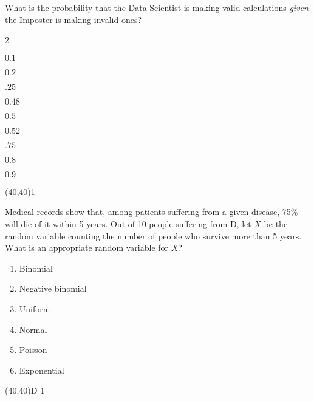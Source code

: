 \documentclass[addpoints]{exam}
\def\solutions{0}
\begin{document}
{\begin{questions}
\question[3] What is the probability that the Data Scientist is making valid calculations \textit{given} the Imposter is making invalid ones?
\vspace{2mm}

\begin{minipage}[b]{.85\textwidth}
	\begin{enumerate}[label=\Alph*.]
	\end{enumerate}
\end{minipage}
\begin{minipage}[b]{.1\textwidth}
	\vspace{\fill}\framebox(40,40){\if\solutions1 \fi}
\end{minipage}

\clearpage
\question[3] Medical records show that, among patients suffering from a given disease, 75\% will die of it within 5 years.  Out of 10 people suffering from D, let $X$ be the random variable counting the number of people who survive more than 5 years.  What is an appropriate random variable for $X$?
\vspace{2mm}

\begin{minipage}[b]{.85\textwidth}
	\begin{enumerate}[label=\Alph*.]
		\item Binomial
		\item Negative binomial
		\item Uniform
		\item Normal
		\item Poisson
		\item Exponential
	\end{enumerate}
\end{minipage}
\begin{minipage}[b]{.1\textwidth}
	\vspace{\fill}\framebox(40,40){D \if\solutions1 \fi}
\end{minipage}


\end{questions}}
\end{document}
